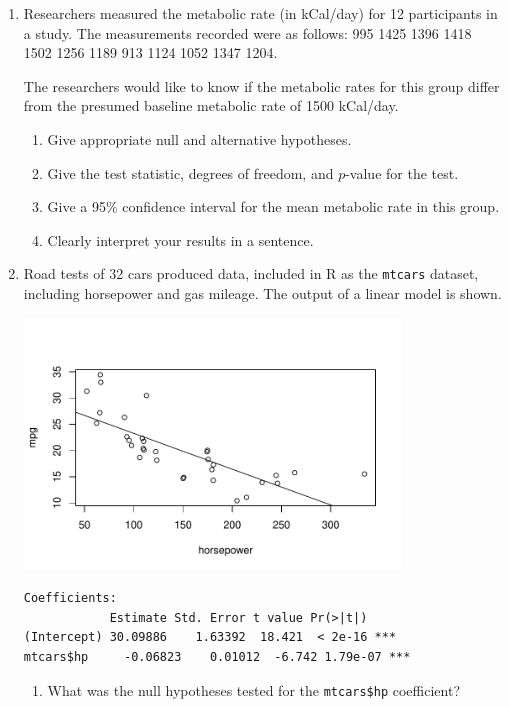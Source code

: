 \documentclass[12pt,fullpage]{amsart}
\begin{document}
\begin{enumerate}
\item Researchers measured the metabolic rate (in kCal/day) for 12 participants in a study.  The measurements recorded were as follows: 995 1425 1396 1418 1502 1256 1189  913 1124 1052 1347 1204.

  The researchers would like to know if the metabolic rates for this group differ from the presumed baseline metabolic rate of 1500 kCal/day.


  \begin{enumerate}
  \item Give appropriate null and alternative hypotheses.
  \item Give the test statistic, degrees of freedom, and $p$-value for
    the test.
\item Give a 95\% confidence interval for the mean metabolic rate in this group.
  \item Clearly interpret your results in a sentence.
  \end{enumerate}




\item Road tests of 32 cars produced data, included in R as the \texttt{mtcars} dataset, including horsepower and gas mileage. The output of a linear model is shown.

\includegraphics[width=10cm]{cars}

\begin{verbatim}
Coefficients:
            Estimate Std. Error t value Pr(>|t|)    
(Intercept) 30.09886    1.63392  18.421  < 2e-16 ***
mtcars$hp     -0.06823    0.01012  -6.742 1.79e-07 ***
\end{verbatim}

  \begin{enumerate}
  \item What was the null hypotheses tested for the \texttt{mtcars\$hp} coefficient?


\end{enumerate}
\end{enumerate}
\end{document}
